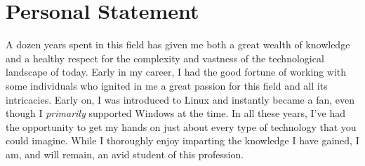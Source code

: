 \documentclass[]{twentysecondcv}
\begin{document}
\section{Personal Statement}
A dozen years spent in this field has given me both a great wealth of knowledge
and a healthy respect for the complexity and vastness of the technological
landscape of today. Early in my career, I had the good fortune of working with
some individuals who ignited in me a great passion for this field and all its
intricacies. Early on, I was introduced to Linux and instantly became a fan, even
though I \emph{primarily} supported Windows at the time. In all these years, I've had
the opportunity to get my hands on just about every type of technology that you could
imagine. While I thoroughly enjoy imparting the knowledge I have gained, I am, and
will remain, an avid student of this profession.

\end{document}
